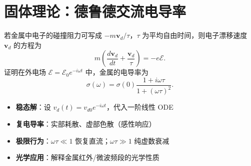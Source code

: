 \section{固体理论：德鲁德交流电导率}
\label{sec:drude-ac-conductivity}

\begin{modelbox}[题目：交变电场中金属电导率的推导]
若金属中电子的碰撞阻力可写成 $-m\bm{v}_d/\tau$，$\tau$ 为平均自由时间，则电子漂移速度 $\bm{v}_d$ 的方程为
\begin{equation}
m\left(\frac{d\bm{v}_d}{dt}+\frac{\bm{v}_d}{\tau}\right)=-e\bm{\mathcal{E}}.
\end{equation}
证明在外电场 $\bm{\mathcal{E}}=\bm{\mathcal{E}}_0e^{-i\omega t}$ 中，金属的电导率为
\begin{equation}
\sigma(\omega)=\sigma(0)\frac{1+i\omega\tau}{1+(\omega\tau)^2}.
\end{equation}
\end{modelbox}

\begin{tipbox}[考点快速分析]
\begin{itemize}
    \item \textbf{稳态解}：设 $v_d(t)=v_{d0}e^{-i\omega t}$，代入一阶线性 ODE
    \item \textbf{复电导率}：实部耗散、虚部色散（感性响应）
    \item \textbf{极限行为}：$\omega\tau\ll1$ 恢复直流；$\omega\tau\gg1$ 纯虚数衰减
    \item \textbf{光学应用}：解释金属红外/微波频段的光学性质
\end{itemize}
\end{tipbox}

